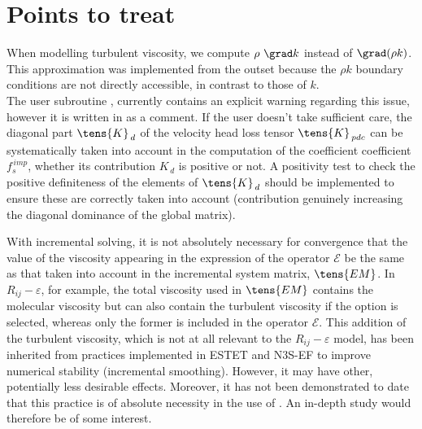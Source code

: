 \section*{Points to treat}\label{Base_Predvv_section4}
When modelling turbulent viscosity, we compute $\rho\ \grad k$ instead of $\grad(\rho k)$. This
approximation was implemented from the outset because the $\rho k$ boundary conditions are not directly accessible, in contrast to those of $k$.\\

The user subroutine , currently contains an explicit warning regarding this issue, however it is written in as a comment.
If the user doesn't take sufficient care, the diagonal part $\tens{K}_{\,d}$ of the velocity head loss tensor
$\tens{K}_{\,pdc}$ can be systematically taken into account in the computation of the coefficient
coefficient $f_s^{\,imp}$, whether its contribution $K_{\,d}$ is positive or not. A positivity test to check the positive definiteness of the elements of $\tens{K}_{\,d}$ should be implemented to ensure these are correctly taken into account (contribution genuinely increasing the diagonal dominance of the global matrix).

With incremental solving, it is not absolutely necessary for convergence that the value of the viscosity appearing in the expression of the operator $\mathcal{E}$ be the same as that taken into account in the incremental system matrix, $\tens{EM}$. In $R_{ij}-\varepsilon$, for example, the total viscosity used in $\tens{EM}$ contains the molecular viscosity but can also contain the turbulent viscosity if the option  is selected, whereas only the former is included in the operator $\mathcal{E}$. This addition of the turbulent viscosity, which is not at all relevant to the $R_{ij}-\varepsilon$ model, has been inherited from practices implemented in
ESTET and N3S-EF to improve numerical stability (incremental smoothing). However, it may have other, potentially less desirable effects. Moreover, it has not been demonstrated to date that this practice is of absolute necessity in the use of \CS. An in-depth study would therefore be of some interest.


